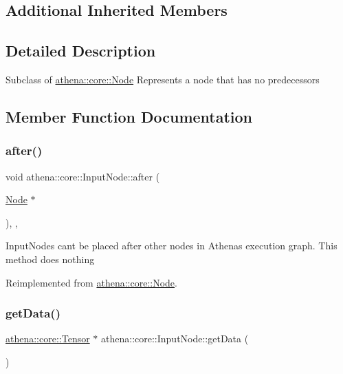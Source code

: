 \subsection*{Additional Inherited Members}


\subsection{Detailed Description}
Subclass of \mbox{\hyperlink{classathena_1_1core_1_1_node}{athena\+::core\+::\+Node}} Represents a node that has no predecessors 

\subsection{Member Function Documentation}
\mbox{\label{classathena_1_1core_1_1_input_node_aaec12f4c76b6d9890efe1fb4337a1b61}} 
\subsubsection{\texorpdfstring{after()}{after()}}
{\footnotesize\ttfamily void athena\+::core\+::\+Input\+Node\+::after (\begin{DoxyParamCaption}\item[{\mbox{\hyperlink{classathena_1_1core_1_1_node}{Node}} $\ast$}]{ }\end{DoxyParamCaption})\hspace{0.3cm}{\ttfamily [inline]}, {\ttfamily [override]}, {\ttfamily [virtual]}}

Input\+Nodes can\textquotesingle{}t be placed after other nodes in Athena\textquotesingle{}s execution graph. This method does nothing 

Reimplemented from \mbox{\hyperlink{classathena_1_1core_1_1_node_aefef588463c8e215e998415a7cc6b320}{athena\+::core\+::\+Node}}.

\mbox{\label{classathena_1_1core_1_1_input_node_a983588a56beeb817a59cf9b7e4a63b55}} 
\subsubsection{\texorpdfstring{get\+Data()}{getData()}}
{\footnotesize\ttfamily \mbox{\hyperlink{classathena_1_1core_1_1_tensor}{athena\+::core\+::\+Tensor}} $\ast$ athena\+::core\+::\+Input\+Node\+::get\+Data (\begin{DoxyParamCaption}{ }\end{DoxyParamCaption})}

